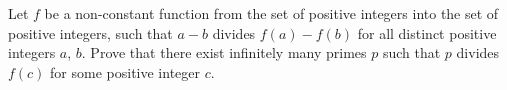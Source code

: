 Let $f$ be a non-constant function from the set of positive integers into the set of positive integers, such that $a - b$ divides $f(a) - f(b)$ for all distinct positive integers $a$, $b$. Prove that there exist infinitely many primes $p$ such that $p$ divides $f(c)$ for some positive integer $c$.
